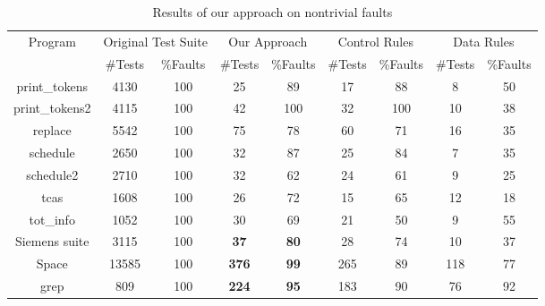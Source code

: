 \documentclass{sig-alternate}
\begin{document}
\begin{table}[htbp]
\caption{Results of our approach on nontrivial
faults}\label{tab:our:nontrivial} \center
\begin{tabular}{|c|c|c|c|c|c|c|c|c|}

\hline Program   & \multicolumn{2}{c}{Original Test Suite} \vline &
\multicolumn{2}{c}{Our Approach} \vline
& \multicolumn{2}{c}{Control Rules} \vline & \multicolumn{2}{c}{Data Rules} \vline   \\

\cline{2-9}  & \#Tests &   \%Faults & \#Tests &   \%Faults &
\#Tests &   \%Faults & \#Tests &   \%Faults \\
\hline  print\_tokens   &   4130    &   100 &   25  &   89  &   17  &   88  &   8   &   50  \\
\hline  print\_tokens2  &   4115    &   100 &   42  &   100 &   32  &   100 &   10  &   38  \\
\hline  replace &   5542    &   100 &   75  &   78  &   60  &   71  &   16  &   35  \\
\hline  schedule    &   2650    &   100 &   32  &   87  &   25  &   84  &   7   &   35  \\
\hline  schedule2   &   2710    &   100 &   32  &   62  &   24  &   61  &   9   &   25  \\
\hline  tcas    &   1608    &   100 &   26  &   72  &   15  &   65  &   12  &   18  \\
\hline  tot\_info &   1052    &   100 &   30  &   69  &   21  &   50  &   9   &   55  \\
\hline  Siemens suite   &   3115    &   100 &   \textbf{37}  &   \textbf{80}  &   28  &   74  &   10  &   37  \\
\hline  Space   &   13585   &   100 &   \textbf{376} &   \textbf{99}  &   265 &   89  &   118 &   77  \\
\hline  grep    &   809 &   100 &   \textbf{224} &   \textbf{95}  &   183 &   90  &   76  &   92  \\

\hline
\end{tabular}
\end{table}
\end{document}
